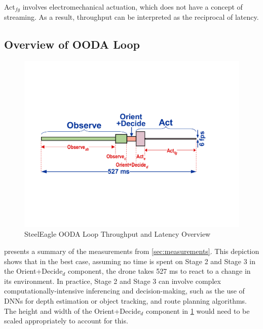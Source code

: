 Act$_{fg}$ involves electromechanical actuation, which does not have a concept
of streaming. As a result, throughput can be interpreted as the reciprocal of
latency.

\subsection{Overview of OODA Loop}

\begin{figure}[htbp]
    \centerline{\includegraphics[width = .6\textwidth]{figs/fig-ooda-scaling.pdf}}
    \caption{SteelEagle OODA Loop Throughput and Latency Overview}
\label{fig:ooda-scaling}
\end{figure}

 presents a summary of the measurements from
\cref{sec:measurements}. This depiction shows that in the best case, assuming
no time is spent on Stage 2 and Stage 3 in the Orient+Decide$_d$ component, the
drone takes 527 ms to react to a change in its environment. In practice, Stage
2 and Stage 3 can involve complex computationally-intensive inferencing and
decision-making, such as the use of DNNs for depth estimation or object
tracking, and route planning algorithms. The height and width of the
Orient+Decide$_d$ component in \cref{fig:ooda-scaling} would need to be scaled
appropriately to account for this.
